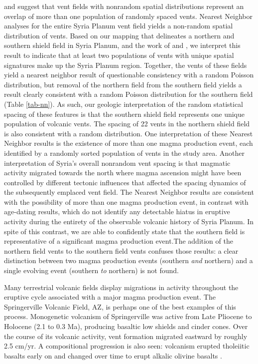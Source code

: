 \citet{Lutz1986} and \citet{Lutz1995} suggest that vent fields with nonrandom spatial distributions represent an overlap of more than one population of randomly spaced vents. Nearest Neighbor analyses for the entire Syria Planum vent field yields a non-random spatial distribution of vents. Based on our mapping that delineates a northern and southern shield field in Syria Planum, and the work of \citet{Lutz1986} and \citet{Lutz1995}, we interpret this result to indicate that at least two populations of vents with unique spatial signatures make up the Syria Planum region. Together, the vents of these fields yield a nearest neighbor result of questionable consistency with a random Poisson distribution, but removal of the northern field from the southern field yields a result clearly consistent with a random Poisson distribution for the southern field (Table \ref{tab-nn}). As such, our geologic interpretation of the random statistical spacing of these features is that the southern shield field represents one unique population of volcanic vents. The spacing of 22 vents in the northern shield field is also consistent with a random distribution. One interpretation of these Nearest Neighbor results is the existence of more than one magma production event, each identified by a randomly sorted population of vents in the study area. Another interpretation of Syria's overall nonrandom vent spacing is that magmatic activity migrated towards the north where magma ascension might have been controlled by different tectonic influences that affected the spacing dynamics of the subsequently emplaced vent field. The Nearest Neighbor results are consistent with the possibility of more than one magma production event, in contrast with age-dating results, which do not identify any detectable hiatus in eruptive activity during the entirety of the observable volcanic history of Syria Planum. In spite of this contrast, we are able to confidently state that the southern field is representative of a significant magma production event.The addition of the northern field vents to the southern field vents confuses those results: a clear distinction between two magma production events (southern \textit{and} northern) and a single evolving event (southern \textit{to} northern) is not found.

Many terrestrial volcanic fields display migrations in activity throughout the eruptive cycle associated with a major magma production event.  The Springerville Volcanic Field, AZ, is perhaps one of the best examples of this process. Monogenetic volcanism of Springerville was active from Late Pliocene to Holocene (2.1 to 0.3 Ma), producing basaltic low shields and cinder cones. Over the course of its volcanic activity, vent formation migrated eastward by roughly 2.5 cm/yr. A compositional progression is also seen: volcanism erupted tholeiitic basalts early on and changed over time to erupt alkalic olivine basalts \citep{Condit1989,Condit1999}.

